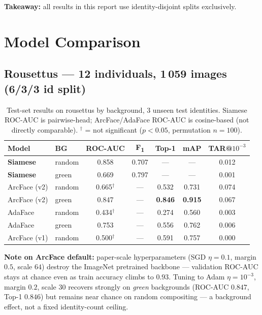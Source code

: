 \documentclass[11pt, a4paper]{article}
\newcommand{\good}[1]{\textcolor{colSiamese}{\textbf{#1}}}
\newcommand{\bad}[1]{\textcolor{colArcFace}{#1}}
\newcommand{\bestval}[1]{\textbf{#1}}
\begin{document}
\textbf{Takeaway:} all results in this report use identity-disjoint splits exclusively.

\section{Model Comparison}

\subsection{Rousettus --- 12 individuals, 1\,059 images (6/3/3 id split)}

\begin{table}[h]
\centering
\caption{Test-set results on rousettus by background, 3 unseen test identities.
Siamese ROC-AUC is pairwise-head; ArcFace/AdaFace ROC-AUC is cosine-based (not directly
comparable). $^{\dagger}$ = not significant ($p<0.05$, permutation $n{=}100$).}
\label{tab:rousettus}
\setlength{\tabcolsep}{5pt}
\begin{tabular}{llccccc}
\toprule
Model & BG & ROC-AUC & F\textsubscript{1} & Top-1 & mAP & TAR@\(10^{-3}\) \\
\midrule
\good{Siamese}  & random & 0.858 & 0.707 & ---   & ---   & 0.012 \\
\good{Siamese}  & green  & 0.669 & 0.797 & ---   & ---   & 0.001 \\
ArcFace (v2)    & random & 0.665$^{\dagger}$ & --- & 0.532 & 0.731 & 0.074 \\
ArcFace (v2)    & green  & 0.847 & --- & \bestval{0.846} & \bestval{0.915} & 0.067 \\
AdaFace         & random & 0.434$^{\dagger}$ & --- & 0.274 & 0.560 & 0.003 \\
AdaFace         & green  & 0.753 & --- & 0.556 & 0.762 & 0.006 \\
ArcFace (v1)    & random & \bad{0.500}$^{\dagger}$ & --- & 0.591 & 0.757 & 0.000 \\
\bottomrule
\end{tabular}
\end{table}

\vspace{-0.2em}
\textbf{Note on ArcFace default:} paper-scale hyperparameters (SGD $\eta{=}0.1$,
margin $0.5$, scale $64$) destroy the ImageNet pretrained backbone --- validation
ROC-AUC stays at chance even as train accuracy climbs to $0.93$. Tuning to
Adam $\eta{=}10^{-3}$, margin $0.2$, scale $30$ recovers strongly on \emph{green}
backgrounds (ROC-AUC $0.847$, Top-1 $0.846$) but remains near chance on random
compositing --- a background effect, not a fixed identity-count ceiling.
\end{document}
